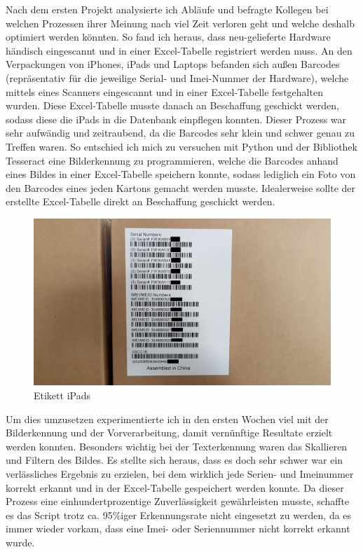 Nach dem ersten Projekt analysierte ich Abläufe und befragte Kollegen bei welchen Prozessen ihrer Meinung nach viel Zeit verloren geht und welche deshalb optimiert werden könnten. So fand ich heraus, dass neu-gelieferte Hardware händisch eingescannt und in einer Excel-Tabelle registriert werden muss. An den Verpackungen von iPhones, iPads und Laptops befanden sich außen Barcodes (repräsentativ für die jeweilige Serial- und Imei-Nummer der Hardware), welche mittels eines Scanners eingescannt und in einer Excel-Tabelle festgehalten wurden. Diese Excel-Tabelle musste danach an Beschaffung geschickt werden, sodass diese die iPads in die Datenbank einpflegen konnten. Dieser Prozess war sehr aufwändig und zeitraubend, da die Barcodes sehr klein und schwer genau zu Treffen waren. So entschied ich mich zu versuchen mit Python und der Bibliothek Tesseract eine Bilderkennung zu programmieren, welche die Barcodes anhand eines Bildes in einer Excel-Tabelle speichern konnte, sodass lediglich ein Foto von den Barcodes eines jeden Kartons gemacht werden musste. Idealerweise sollte der erstellte Excel-Tabelle direkt an Beschaffung geschickt werden.
\begin{figure}[H] 
  \centering
     \includegraphics[width=1\textwidth]{etikett.jpg}
  \caption{Etikett iPads}
  \label{fig:Bild1}
\end{figure}
\noindent 
Um dies umzusetzen experimentierte ich in den ersten Wochen viel mit der Bilderkennung und der Vorverarbeitung, damit vernünftige Resultate erzielt werden konnten. Besonders wichtig bei der Texterkennung waren das Skallieren und Filtern des Bildes. Es stellte sich heraus, dass es doch sehr schwer war ein verlässliches Ergebnis zu erzielen, bei dem wirklich jede Serien- und Imeinummer korrekt erkannt und in der Excel-Tabelle gespeichert werden konnte. Da dieser Prozess eine einhundertprozentige Zuverlässigkeit gewährleisten musste, schaffte es das Script trotz ca. 95\%iger Erkennungsrate nicht eingesetzt zu werden, da es immer wieder vorkam, dass eine Imei- oder Seriennummer nicht korrekt erkannt wurde. 
\\

